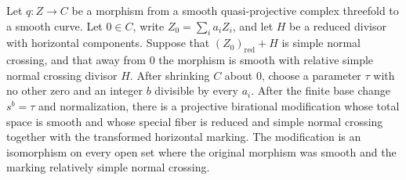 \begin{proposition}
\label{prop:marked-monomial-reduction}
Let $q:Z\to C$ be a morphism from a smooth quasi-projective complex
threefold to a smooth curve.  Let $0\in C$, write
$Z_0=\sum_i a_iZ_i$, and let $H$ be a reduced divisor with horizontal
components.  Suppose that $(Z_0)_{\mathrm{red}}+H$ is simple normal
crossing, and that away from $0$ the morphism is smooth with relative
simple normal crossing divisor $H$.
After shrinking $C$ about $0$, choose a parameter $\tau$ with no
other zero and an integer $b$ divisible by every $a_i$.  After the
finite base change $s^b=\tau$ and normalization, there is a projective
birational modification whose total space is smooth and whose special
fiber is reduced and simple normal crossing together with the
transformed horizontal marking.  The modification is an isomorphism
on every open set where the original morphism was smooth and the
marking relatively simple normal crossing.
\end{proposition}

